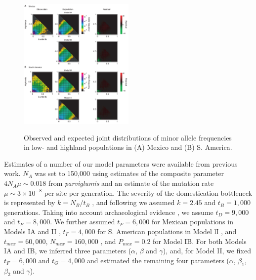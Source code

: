 \begin{figure}[tb]   
  \begin{center}
   \vspace{-0mm}
   \includegraphics[width=0.5\textwidth]{fig/Fig4}
   \renewcommand{\baselinestretch}{0.9}
   \vspace{-3mm}
   \caption{Observed and expected joint distributions of minor allele frequencies in low- and highland populations in (A) Mexico and (B) S. America. }
\vspace{-6mm}
    \label{JFD}
  \end{center}
\end{figure}

Estimates of a number of our model parameters were available from previous work.    
$N_A$ was set to 150,000 using estimates of the composite parameter $4N_A\mu \sim 0.018$ from \emph{parviglumis}  \cite[]{Eyre-Walker_1998_9539756,Tenaillon_2001_11470895,Tenaillon_2004_15014173,Wright_2005_15919994,Ross-Ibarra_2009_19153259} and an estimate of the mutation rate $\mu \sim 3\times 10^{-8}$ \cite[]{Clark_2005_16079248} per site per generation.  
The severity of the domestication bottleneck is represented by $k=N_B/t_B$ \cite[]{Eyre-Walker_1998_9539756,Wright_2005_15919994}, and following \cite{Wright_2005_15919994} we assumed $k=2.45$ and $t_B=1,000$ generations.  
Taking into account archaeological evidence \cite[]{Piperno_2009_19307570}, we assume $t_D=9,000$ and $t_E=8,000$.  
We further assumed $t_F=6,000$ for Mexican populations in Models IA and II \cite[]{Piperno_2006_69}, $t_F=4,000$ for S. American populations in Model lI \cite[]{Perry_2006_16511492}, and $t_{mex}=60,000$, $N_{mex}=160,000$ \cite[]{Ross-Ibarra_2009_19153259}, and $P_{mex}=0.2$ \cite[]{vanHeerwaarden_2011_21189301} for Model IB. 
For both Models IA and IB, we inferred three parameters ($\alpha$, $\beta$ and $\gamma$), and, for Model II, we fixed $t_F=6,000$ and $t_G=4,000$ \cite[]{Piperno_2006_69,Perry_2006_16511492}  and estimated the remaining four parameters ($\alpha$, $\beta_1$, $\beta_2$ and $\gamma$).

